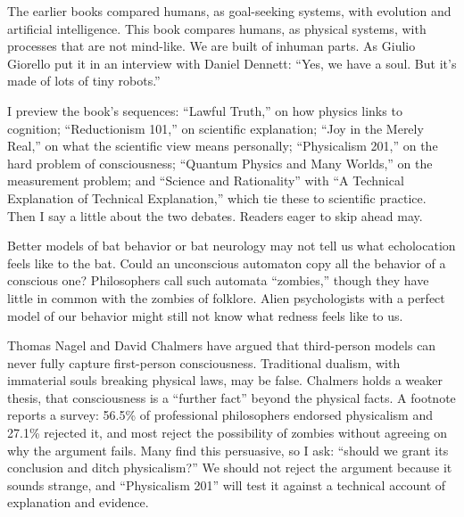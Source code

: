 
The earlier books compared humans, as goal-seeking systems, with evolution and artificial intelligence. This book compares humans, as physical systems, with processes that are not mind-like. We are built of inhuman parts. As Giulio Giorello put it in an interview with Daniel Dennett: ``Yes, we have a soul. But it's made of lots of tiny robots.''

I preview the book's sequences: ``Lawful Truth,'' on how physics links to cognition; ``Reductionism 101,'' on scientific explanation; ``Joy in the Merely Real,'' on what the scientific view means personally; ``Physicalism 201,'' on the hard problem of consciousness; ``Quantum Physics and Many Worlds,'' on the measurement problem; and ``Science and Rationality'' with ``A Technical Explanation of Technical Explanation,'' which tie these to scientific practice. Then I say a little about the two debates. Readers eager to skip ahead may.

Better models of bat behavior or bat neurology may not tell us what echolocation feels like to the bat. Could an unconscious automaton copy all the behavior of a conscious one? Philosophers call such automata ``zombies,'' though they have little in common with the zombies of folklore.  Alien psychologists with a perfect model of our behavior might still not know what redness feels like to us.

Thomas Nagel and David Chalmers have argued that third-person models can never fully capture first-person consciousness. Traditional dualism, with immaterial souls breaking physical laws, may be false. Chalmers holds a weaker thesis, that consciousness is a ``further fact'' beyond the physical facts. A footnote reports a survey: 56.5\% of professional philosophers endorsed physicalism and 27.1\% rejected it, and most reject the possibility of zombies without agreeing on why the argument fails. Many find this persuasive, so I ask: ``should we grant its conclusion and ditch physicalism?''  We should not reject the argument because it sounds strange, and ``Physicalism 201'' will test it against a technical account of explanation and evidence.


